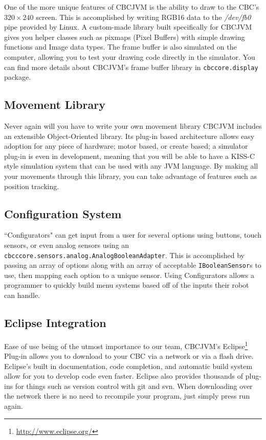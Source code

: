 \documentclass[12pt,letterpaper]{article}
\newcommand{\urlfootnote}[1]{\footnote{\url{#1}}}
\begin{document}
One of the more unique features of CBCJVM is the ability to draw to the CBC's $320 \times 240$ screen. This is accomplished by writing RGB16 data to the \textsl{/dev/fb0} pipe provided by Linux. A custom-made library built specifically for CBCJVM gives you helper classes such as pixmaps (Pixel Buffers) with simple drawing functions and Image data types. The frame buffer is also simulated on the computer, allowing you to test your drawing code directly in the simulator. You can find more details about CBCJVM's frame buffer library in \texttt{cbccore.display} package.



\subsection{Movement Library}

Never again will you have to write your own movement library CBCJVM includes an extensible Object-Oriented library. Its plug-in based architecture allows easy adoption for any piece of hardware; motor based, or create based; a simulator plug-in is even in development, meaning that you will be able to have a KISS-C style simulation system that can be used with any JVM language. By making all your movements through this library, you can take advantage of features such as position tracking.



\subsection{Configuration System}

``Configurators" can get input from a user for several options using buttons, touch sensors, or even analog sensors using an \texttt{cbcccore.\-sensors.\-analog.\-AnalogBooleanAdapter}. This is accomplished by passing an array of options along with an array of acceptable \texttt{IBooleanSensor}s to use, then mapping each option to a unique sensor. Using Configurators allows a programmer to quickly build menu systems based off of the inputs their robot can handle.



\subsection{Eclipse Integration}

Ease of use being of the utmost importance to our team, CBCJVM's Eclipse\urlfootnote{http://www.eclipse.org/} Plug-in allows you to download to your CBC via a network or via a flash drive. Eclipse's built in documentation, code completion, and automatic build system allow for you to develop code even faster. Eclipse also provides thousands of plug-ins for things such as version control with git and svn. When downloading over the network there is no need to recompile your program, just simply press run again.
\end{document}
